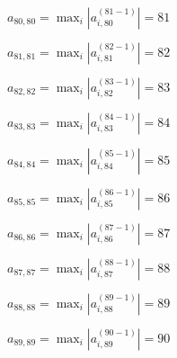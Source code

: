 \documentclass[a4paper,12pt]{article}
\begin{document}
$a _{ 80, 80 } =  \max _i |a _{ i, 80 } ^{ (81 - 1) } | = 81$

$a _{ 81, 81 } =  \max _i |a _{ i, 81 } ^{ (82 - 1) } | = 82$

$a _{ 82, 82 } =  \max _i |a _{ i, 82 } ^{ (83 - 1) } | = 83$

$a _{ 83, 83 } =  \max _i |a _{ i, 83 } ^{ (84 - 1) } | = 84$

$a _{ 84, 84 } =  \max _i |a _{ i, 84 } ^{ (85 - 1) } | = 85$

$a _{ 85, 85 } =  \max _i |a _{ i, 85 } ^{ (86 - 1) } | = 86$

$a _{ 86, 86 } =  \max _i |a _{ i, 86 } ^{ (87 - 1) } | = 87$

$a _{ 87, 87 } =  \max _i |a _{ i, 87 } ^{ (88 - 1) } | = 88$

$a _{ 88, 88 } =  \max _i |a _{ i, 88 } ^{ (89 - 1) } | = 89$

$a _{ 89, 89 } =  \max _i |a _{ i, 89 } ^{ (90 - 1) } | = 90$
\end{document}
